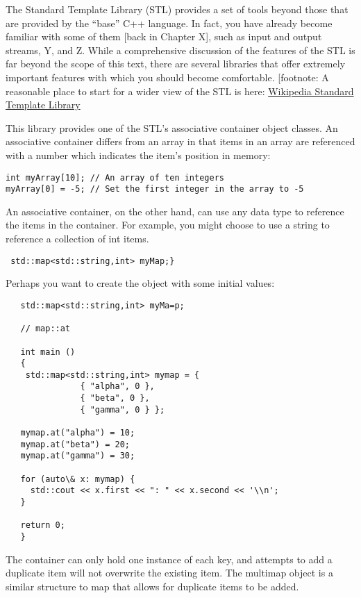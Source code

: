 The Standard Template Library (STL) provides a set of tools beyond those that are provided by the ``base'' C++ language. In fact, you have already become familiar with some of them [back in Chapter X], such as input and output streams, Y, and Z. While a comprehensive discussion of the features of the STL is far beyond the scope of this text, there are several libraries that offer extremely important features with which you should become comfortable. [footnote: A reasonable place to start for a wider view of the STL is here:
 \href{http://en.wikipedia.org/wiki/Standard_Template_Library}
      {Wikipedia Standard Template Library}





This library provides one of the STL's associative container object classes. An associative container differs from an array in that items in an array are referenced with a number which indicates the item’s position in memory:

 \begin{lstlisting}
int myArray[10]; // An array of ten integers
myArray[0] = -5; // Set the first integer in the array to -5
 \end{lstlisting}


An associative container, on the other hand, can use any data type to reference the items in the container. For example, you might choose to use a string to reference a collection of int items.


 \begin{lstlisting}
 std::map<std::string,int> myMap;}
\end{lstlisting}

Perhaps you want to create the object with some initial values:

 \begin{lstlisting}
   std::map<std::string,int> myMa=p;

   // map::at

   int main ()
   {
    std::map<std::string,int> mymap = {
               { "alpha", 0 },
               { "beta", 0 },
               { "gamma", 0 } };

   mymap.at("alpha") = 10;
   mymap.at("beta") = 20;
   mymap.at("gamma") = 30;

   for (auto\& x: mymap) {
     std::cout << x.first << ": " << x.second << '\\n';
   }

   return 0;
   }
 \end{lstlisting}

The container can only hold one instance of each key, and attempts to add a duplicate item will not overwrite the existing item. The multimap object is a similar structure to map that allows for duplicate items to be added.